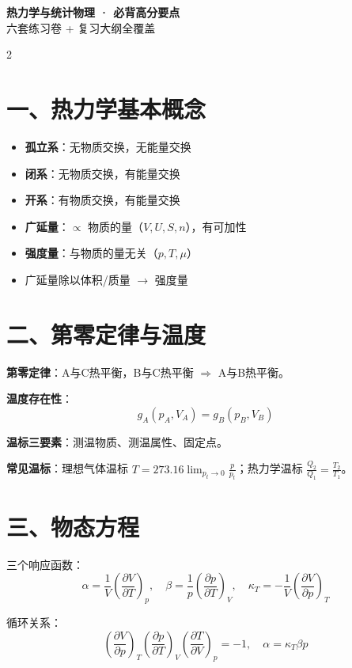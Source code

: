 \documentclass[10pt,a4paper,fontset=mac]{ctexart}
\newcommand{\đ}{\mathrm{đ}}
\begin{document}
\begin{center}
{\LARGE \textbf{热力学与统计物理 · 必背高分要点}}\\[0.3em]
{\normalsize 六套练习卷 + 复习大纲全覆盖}
\end{center}

\vspace{-0.5em}

\begin{multicols}{2}

\section*{一、热力学基本概念}

\begin{itemize}
\item \textbf{孤立系}：无物质交换，无能量交换
\item \textbf{闭系}：无物质交换，有能量交换
\item \textbf{开系}：有物质交换，有能量交换
\item \textbf{广延量}：$\propto$ 物质的量（$V,U,S,n$），有可加性
\item \textbf{强度量}：与物质的量无关（$p,T,\mu$）
\item 广延量除以体积/质量 $\to$ 强度量
\end{itemize}

\section*{二、第零定律与温度}

\textbf{第零定律}：A与C热平衡，B与C热平衡 $\Rightarrow$ A与B热平衡。

\textbf{温度存在性}：
\[
g_A(p_A,V_A)=g_B(p_B,V_B)
\]

\textbf{温标三要素}：测温物质、测温属性、固定点。

\textbf{常见温标}：理想气体温标 $T=273.16\lim_{p_t\to0}\frac{p}{p_t}$；热力学温标 $\frac{Q_2}{Q_1}=\frac{T_2}{T_1}$。

\section*{三、物态方程}

三个响应函数：
\[
\alpha=\frac{1}{V}\!\left(\frac{\partial V}{\partial T}\right)_p,\quad
\beta=\frac{1}{p}\!\left(\frac{\partial p}{\partial T}\right)_V,\quad
\kappa_T=-\frac{1}{V}\!\left(\frac{\partial V}{\partial p}\right)_T
\]

循环关系：
\[
\left(\frac{\partial V}{\partial p}\right)_T\left(\frac{\partial p}{\partial T}\right)_V\left(\frac{\partial T}{\partial V}\right)_p=-1,\quad \alpha=\kappa_T\beta p
\]


\end{multicols}
\end{document}
